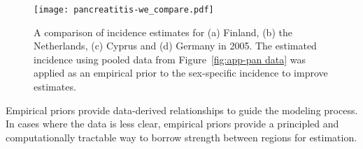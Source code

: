     \begin{figure}[h]
        \begin{center}
            \texttt{[image: pancreatitis-we\_compare.pdf]}
            \caption{A comparison of incidence estimates for (a) Finland,
              (b) the Netherlands, (c) Cyprus and (d) Germany in 2005.  The estimated incidence
              using pooled data from Figure~\ref{fig:app-pan data} was applied
              as an empirical prior to the sex-specific incidence to
              improve estimates.}
            \label{fig:app-pan compare}
        \end{center}
    \end{figure}
    
Empirical priors provide data-derived relationships to guide the
modeling process.  In cases where the data is less clear, empirical
priors provide a principled and computationally tractable way to
borrow strength between regions for estimation.
